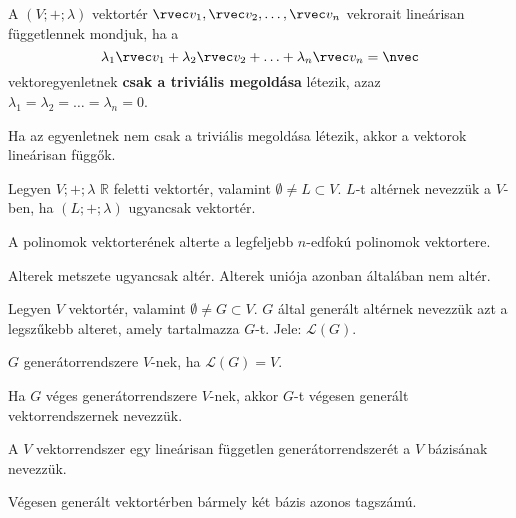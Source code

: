 \begin{definition}

  A $(V; +; \lambda)$ vektortér $\rvec v_1, \rvec v_2, \ldots, \rvec v_n$
  vekrorait lineárisan függetlennek mondjuk, ha a
  $$
    \lambda_1 \rvec v_1
    + \lambda_2 \rvec v_2
    + \ldots
    + \lambda_n \rvec v_n
    = \nvec
  $$
  vektoregyenletnek \textbf{csak a triviális megoldása} létezik, azaz
  $\lambda_1 = \lambda_2 = \ldots = \lambda_n = 0$.

  Ha az egyenletnek nem csak a triviális megoldása létezik, akkor a vektorok
  lineárisan függők.
\end{definition}

\begin{definition}[Altér]
  Legyen $V; +; \lambda$ $\mathbb R$ feletti vektortér, valamint
  $\emptyset \neq L \subset V$. $L$-t altérnek nevezzük a $V$-ben, ha
  $(L; +; \lambda)$ ugyancsak vektortér.
\end{definition}

\begin{example}
  A polinomok vektorterének alterte a legfeljebb $n$-edfokú polinomok
  vektortere.
\end{example}

\begin{statement}
  Alterek metszete ugyancsak altér. Alterek uniója azonban általában nem altér.
\end{statement}

\begin{definition}[Generátorrendszer]
  Legyen $V$ vektortér, valamint $\emptyset \neq G \subset V$. $G$ által
  generált altérnek nevezzük azt a legszűkebb alteret, amely tartalmazza $G$-t.
  Jele: $\mathcal L(G)$.

  $G$ generátorrendszere $V$-nek, ha $\mathcal L(G) = V$.
\end{definition}

\begin{note}
  Ha $G$ véges generátorrendszere $V$-nek, akkor $G$-t végesen generált
  vektorrendszernek nevezzük.
\end{note}

\begin{definition}[Bázis]
  A $V$ vektorrendszer egy lineárisan független generátorrendszerét a $V$
  bázisának nevezzük.
\end{definition}

\begin{statement}
  Végesen generált vektortérben bármely két bázis azonos tagszámú.
\end{statement}

